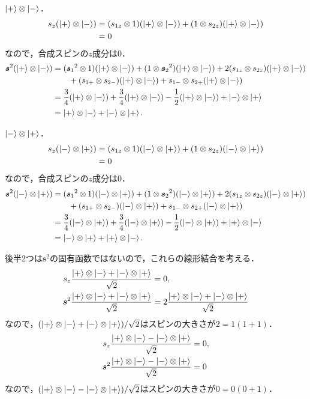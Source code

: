 \documentclass[a4paper]{ltjsreport}
\begin{document}
$\ket{+} \otimes \ket{-} $．
\begin{align*}
  s_z(\ket{+} \otimes \ket{-} ) &= (s_{1z} \otimes 1)(\ket{+} \otimes \ket{-} ) + (1 \otimes s_{2z})(\ket{+} \otimes \ket{-} ) \\
  &= 0
\end{align*}
なので，合成スピンの$z$成分は$0$．
\begin{align*}
  \boldsymbol{s}^2(\ket{+} \otimes \ket{-} ) &= (\boldsymbol{s}_1{}^2 \otimes 1)(\ket{+} \otimes \ket{-} ) + (1 \otimes \boldsymbol{s}_2{}^2)(\ket{+} \otimes \ket{-} ) + 2 (s_{1z} \otimes s_{2z})(\ket{+} \otimes \ket{-} )\\
  & \qquad + (s_{1+} \otimes s_{2-})(\ket{+} \otimes \ket{-} ) + s_{1-} \otimes s_{2+}(\ket{+} \otimes \ket{-} ) \\
  &= \frac{3}{4}(\ket{+} \otimes \ket{-} ) + \frac{3}{4}(\ket{+} \otimes \ket{-} ) - \frac{1}{2}(\ket{+} \otimes \ket{-} ) + \ket{-} \otimes \ket{+} \\
  &= \ket{+} \otimes \ket{-} + \ket{-} \otimes \ket{+} .
\end{align*}

$\ket{-} \otimes \ket{+} $．
\begin{align*}
  s_z(\ket{-} \otimes \ket{+} ) &= (s_{1z} \otimes 1)(\ket{-} \otimes \ket{+} ) + (1 \otimes s_{2z})(\ket{-} \otimes \ket{+} ) \\
  &= 0
\end{align*}
なので，合成スピンの$z$成分は$0$．
\begin{align*}
  \boldsymbol{s}^2(\ket{-} \otimes \ket{+} ) &= (\boldsymbol{s}_1{}^2 \otimes 1)(\ket{-} \otimes \ket{+} ) + (1 \otimes \boldsymbol{s}_2{}^2)(\ket{-} \otimes \ket{+} ) + 2 (s_{1z} \otimes s_{2z})(\ket{-} \otimes \ket{+} )\\
  & \qquad + (s_{1+} \otimes s_{2-})(\ket{-} \otimes \ket{+} ) + s_{1-} \otimes s_{2+}(\ket{-} \otimes \ket{+} ) \\
  &= \frac{3}{4}(\ket{-} \otimes \ket{+} ) + \frac{3}{4}(\ket{-} \otimes \ket{+} ) - \frac{1}{2}(\ket{-} \otimes \ket{+} ) + \ket{+} \otimes \ket{-} \\
  &= \ket{-} \otimes \ket{+} + \ket{+} \otimes \ket{-} .
\end{align*}

後半2つは$\boldsymbol{s}^2$の固有函数ではないので，これらの線形結合を考える．
\begin{align*}
  s_z \frac{\ket{+} \otimes \ket{-} + \ket{-} \otimes \ket{+}}{\sqrt{2}} &= 0 , \\
  \boldsymbol{s}^2 \frac{\ket{+} \otimes \ket{-} + \ket{-} \otimes \ket{+}}{\sqrt{2}} &= 2 \frac{\ket{+} \otimes \ket{-} + \ket{-} \otimes \ket{+}}{\sqrt{2}}
\end{align*}
なので，$(\ket{+} \otimes \ket{-} + \ket{-} \otimes \ket{+})/\sqrt{2}$はスピンの大きさが$2=1(1+1)$．
\begin{align*}
  s_z \frac{\ket{+} \otimes \ket{-} - \ket{-} \otimes \ket{+}}{\sqrt{2}} &= 0 , \\
  \boldsymbol{s}^2 \frac{\ket{+} \otimes \ket{-} - \ket{-} \otimes \ket{+}}{\sqrt{2}} &= 0
\end{align*}
なので，$(\ket{+} \otimes \ket{-} - \ket{-} \otimes \ket{+})/\sqrt{2}$はスピンの大きさが$0=0(0+1)$．
\end{document}
